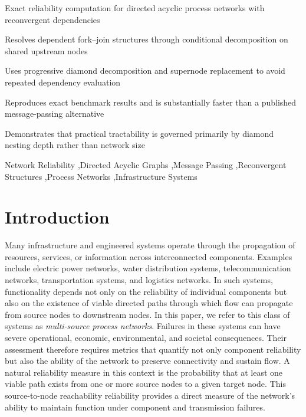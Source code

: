 \documentclass[preprint,12pt]{elsarticle}
\begin{document}
\begin{frontmatter}
\begin{highlights}
\item Exact reliability computation for directed acyclic process networks with reconvergent dependencies
\item Resolves dependent fork--join structures through conditional decomposition on shared upstream nodes
\item Uses progressive diamond decomposition and supernode replacement to avoid repeated dependency evaluation
\item Reproduces exact benchmark results and is substantially faster than a published message-passing alternative
\item Demonstrates that practical tractability is governed primarily by diamond nesting depth rather than network size
\end{highlights}


\begin{keyword}
Network Reliability \sep Directed Acyclic Graphs \sep Message Passing \sep Reconvergent Structures \sep Process Networks \sep Infrastructure Systems
\end{keyword}

\end{frontmatter}




\section{Introduction}

Many infrastructure and engineered systems operate through the propagation of resources, services, or information across interconnected components. Examples include electric power networks, water distribution systems, telecommunication networks, transportation systems, and logistics networks. In such systems, functionality depends not only on the reliability of individual components but also on the existence of viable directed paths through which flow can propagate from source nodes to downstream nodes. In this paper, we refer to this class of systems as \emph{multi-source process networks}.
Failures in these systems can have severe operational, economic, environmental, and societal consequences. Their assessment therefore requires metrics that quantify not only component reliability but also the ability of the network to preserve connectivity and sustain flow. A natural reliability measure in this context is the probability that at least one viable path exists from one or more source nodes to a given target node. This source-to-node reachability reliability provides a direct measure of the network's ability to maintain function under component and transmission failures.
\end{document}
